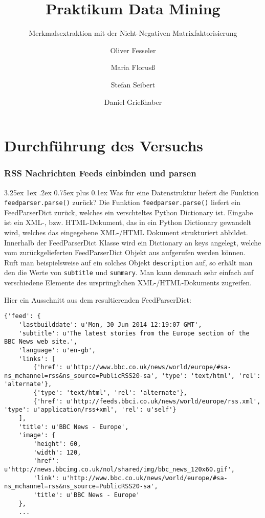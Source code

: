 \documentclass[12pt,a4paper]{scrartcl}
\makeatletter
\renewcommand\subparagraph{\@startsection{subparagraph}{5}{\parindent}%
    {3.25ex \@plus1ex \@minus .2ex}%
    {0.75ex plus 0.1ex}%
    {\normalfont\normalsize\bfseries}}
\makeatother
\begin{document}
\title{Praktikum Data Mining}
\subtitle{Merkmalsextraktion mit der Nicht-Negativen Matrixfaktorisierung}
\author{Oliver Fesseler \and Maria Florus\ss \and Stefan Seibert \and  Daniel Grie\ss haber}
\maketitle
\newpage

\part*{Durchf\"uhrung des Versuchs}

\section*{RSS Nachrichten Feeds einbinden und parsen}
\subparagraph{Was f\"ur eine Datenstruktur liefert die Funktion \lstinline|feedparser.parse()| zur\"uck?}
Die Funktion \lstinline|feedparser.parse()| liefert ein FeedParserDict zur\"uck, welches ein verschteltes Python Dictionary ist. Eingabe ist ein XML-, bzw. HTML-Dokument, das in ein Python Dictionary gewandelt wird, welches das eingegebene XML-/HTML Dokument strukturiert abbildet. Innerhalb der FeedParserDict Klasse wird ein Dictionary an keys angelegt, welche vom zur\"uckgelieferten FeedParserDict Objekt aus aufgerufen werden k\"onnen. 
Ruft man beispielsweise auf ein solches Objekt \lstinline|description| auf, so erh\"alt man den die Werte von \lstinline|subtitle| und \lstinline|summary|. 
Man kann demnach sehr einfach auf verschiedene Elemente des urspr\"unglichen XML-/HTML-Dokuments zugreifen. 

Hier ein Ausschnitt aus dem resultierenden FeedParserDict:

\begin{lstlisting}
{'feed': {
	'lastbuilddate': u'Mon, 30 Jun 2014 12:19:07 GMT', 
	'subtitle': u'The latest stories from the Europe section of the BBC News web site.', 
	'language': u'en-gb', 
	'links': [
		{'href': u'http://www.bbc.co.uk/news/world/europe/#sa-ns_mchannel=rss&ns_source=PublicRSS20-sa', 'type': 'text/html', 'rel': 'alternate'}, 
		{'type': 'text/html', 'rel': 'alternate'}, 
		{'href': u'http://feeds.bbci.co.uk/news/world/europe/rss.xml', 'type': u'application/rss+xml', 'rel': u'self'}
	],
	'title': u'BBC News - Europe', 
	'image': {
		'height': 60, 
		'width': 120, 
		'href': u'http://news.bbcimg.co.uk/nol/shared/img/bbc_news_120x60.gif', 
		'link': u'http://www.bbc.co.uk/news/world/europe/#sa-ns_mchannel=rss&ns_source=PublicRSS20-sa', 
		'title': u'BBC News - Europe'
	},
	...
\end{lstlisting}
\end{document}
